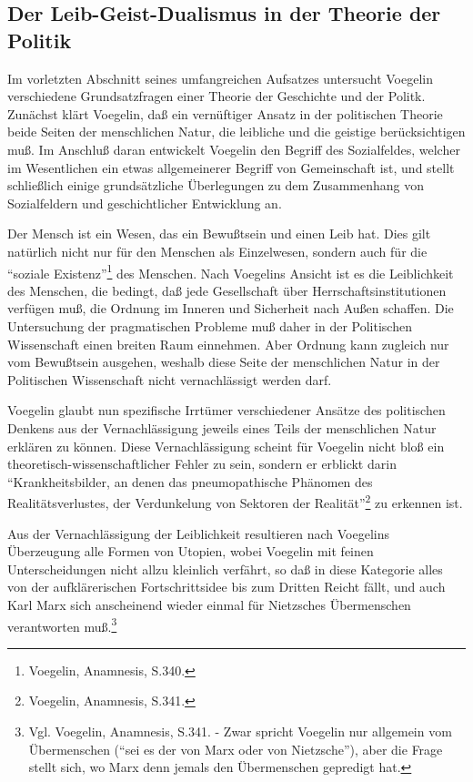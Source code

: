 \subsection{Der Leib-Geist-Dualismus in der Theorie der Politik}

Im vorletzten Abschnitt seines umfangreichen Aufsatzes untersucht Voegelin
verschiedene Grundsatzfragen einer Theorie der Geschichte und der Politk.
Zunächst klärt Voegelin, daß ein vernüftiger Ansatz in der politischen Theorie
beide Seiten der menschlichen Natur, die leibliche und die geistige
berücksichtigen muß. Im Anschluß daran entwickelt Voegelin den Begriff des
Sozialfeldes, welcher im Wesentlichen ein etwas allgemeinerer Begriff von
Gemeinschaft ist, und stellt schließlich einige grundsätzliche Überlegungen zu
dem Zusammenhang von Sozialfeldern und geschichtlicher Entwicklung an.

Der Mensch ist ein Wesen, das ein Bewußtsein und einen Leib hat. Dies gilt
natürlich nicht nur für den Menschen als Einzelwesen, sondern auch für die
"`soziale Existenz"'\footnote{Voegelin, Anamnesis, S.340.} des Menschen. Nach
Voegelins Ansicht ist es die Leiblichkeit des Menschen, die bedingt, daß jede
Gesellschaft über Herrschaftsinstitutionen verfügen muß, die Ordnung im
Inneren und Sicherheit nach Außen schaffen. Die Untersuchung der pragmatischen
Probleme muß daher in der Politischen Wissenschaft einen breiten Raum
einnehmen. Aber Ordnung kann zugleich nur vom Bewußtsein ausgehen, weshalb
diese Seite der menschlichen Natur in der Politischen Wissenschaft nicht
vernachlässigt werden darf.

Voegelin glaubt nun spezifische Irrtümer verschiedener Ansätze des politischen
Denkens aus der Vernachlässigung jeweils eines Teils der menschlichen Natur
erklären zu können. Diese Vernachlässigung scheint für Voegelin nicht bloß ein
theoretisch-wissenschaftlicher Fehler zu sein, sondern er erblickt darin 
"`Krankheitsbilder, an denen das pneumopathische Phänomen des
Realitätsverlustes, der Verdunkelung von Sektoren der
Realität"'\footnote{Voegelin, Anamnesis, S.341.} zu erkennen ist.

Aus der Vernachlässigung der Leiblichkeit resultieren nach Voegelins
Überzeugung alle Formen von Utopien, wobei Voegelin mit feinen
Unterscheidungen nicht allzu kleinlich verfährt, so daß in diese Kategorie
alles von der aufklärerischen Fortschrittsidee bis zum Dritten Reicht fällt,
und auch Karl Marx sich anscheinend wieder einmal für Nietzsches Übermenschen
verantworten muß.\footnote{Vgl. Voegelin, Anamnesis, S.341. - Zwar spricht
  Voegelin nur allgemein vom Übermenschen ("`sei es der von Marx oder von
  Nietzsche"'), aber die Frage stellt sich, wo Marx denn jemals den
  Übermenschen gepredigt hat.}


